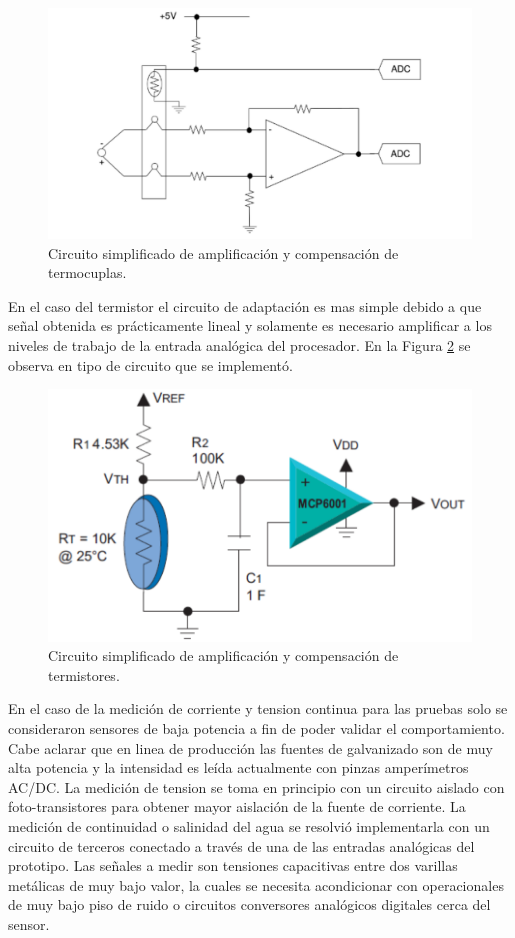 
\begin{figure}[h!]
	\centering
	\includegraphics[width=.7\textwidth]{Figures/Cap_3/circuito_ampl_termocupla}
	\caption{Circuito simplificado de amplificación y compensación de termocuplas.}
	\label{fig:cirCompTermocupla}
\end{figure}

En el caso del termistor el circuito de adaptación es mas simple debido a que señal obtenida es prácticamente lineal y solamente es necesario amplificar a los niveles de trabajo de la entrada analógica del procesador. En la Figura \ref{fig:cirCompTermistor} se observa en tipo de circuito que se implementó.

\begin{figure}[h!]
	\centering
	\includegraphics[width=.7\textwidth]{Figures/Cap_3/thermistor-conventional-circuit}
	\caption{Circuito simplificado de amplificación y compensación de termistores.}
	\label{fig:cirCompTermistor}
\end{figure}

En el caso de la medición de corriente y tension continua para las pruebas solo se consideraron sensores de baja potencia a fin de poder validar el comportamiento. Cabe aclarar que en linea de producción las fuentes de galvanizado son de muy alta potencia y la intensidad es leída actualmente con pinzas amperímetros AC/DC.
La medición de tension se toma en principio con un circuito aislado con foto-transistores para obtener mayor aislación de la fuente de corriente.
La medición de continuidad o salinidad del agua se resolvió implementarla con un circuito de terceros conectado a través de una de las entradas analógicas del prototipo. Las señales a medir son tensiones capacitivas entre dos varillas metálicas de muy bajo valor, la cuales se necesita acondicionar con operacionales de muy bajo piso de ruido o circuitos conversores analógicos digitales cerca del sensor.

